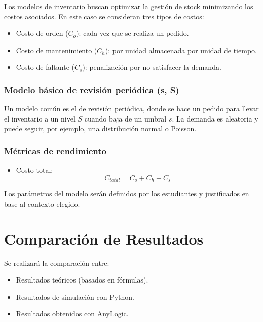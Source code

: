 \documentclass{article}
\begin{document}
Los modelos de inventario buscan optimizar la gestión de stock minimizando los costos asociados. En este caso se consideran tres tipos de costos:

\begin{itemize}
    \item Costo de orden (\( C_o \)): cada vez que se realiza un pedido.
    \item Costo de mantenimiento (\( C_h \)): por unidad almacenada por unidad de tiempo.
    \item Costo de faltante (\( C_s \)): penalización por no satisfacer la demanda.
\end{itemize}

\subsubsection*{Modelo básico de revisión periódica (s, S)}

Un modelo común es el de revisión periódica, donde se hace un pedido para llevar el inventario a un nivel \( S \) cuando baja de un umbral \( s \). La demanda es aleatoria y puede seguir, por ejemplo, una distribución normal o Poisson.

\subsubsection*{Métricas de rendimiento}

\begin{itemize}
    \item Costo total: 
    \[
        C_{total} = C_o + C_h + C_s
    \]
\end{itemize}

Los parámetros del modelo serán definidos por los estudiantes y justificados en base al contexto elegido.

\vspace{1em}

\section{Comparación de Resultados}
Se realizará la comparación entre:
\begin{itemize}
    \item Resultados teóricos (basados en fórmulas).
    \item Resultados de simulación con Python.
    \item Resultados obtenidos con AnyLogic.
\end{itemize}
\end{document}
